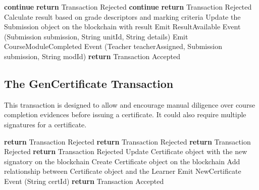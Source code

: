 \begin{algorithm}
	\begin{algorithmic}[0]
		\State \textbf{continue}
		\Else \textbf{ return} Transaction Rejected
		\EndIf
		\State \textbf{continue}
		\Else \textbf{ return} Transaction Rejected
		\EndIf
		\State Calculate result based on grade descriptors and marking criteria
		\State Update the Submission object on the blockchain with result
		\State Emit ResultAvailable Event (Submission submission, String unitId, String details)
		\State Emit CourseModuleCompleted Event (Teacher teacherAssigned, Submission submission, String modId)
		\EndIf
		\EndIf
		\State \textbf{return} Transaction Accepted
		\EndFunction
	\end{algorithmic}
\end{algorithm}

\subsection{The GenCertificate Transaction}

This transaction is designed to allow and encourage manual diligence over course completion evidences before issuing a certificate.
It could also require multiple signatures for a certificate.
\begin{algorithm}
	\begin{algorithmic}[0]
		 \textbf{return} Transaction Rejected \EndIf
		 \textbf{return} Transaction Rejected \EndIf
		\Else
		 \textbf{return} Transaction Rejected \EndIf
		 \textbf{return} Transaction Rejected \EndIf
		\EndIf
		\State Update Certificate object with the new signatory on the blockchain
		\Else
		\State Create Certificate object on the blockchain
		\EndIf
		\State Add relationship between Certificate object and the Learner
		\State Emit NewCertificate Event (String certId)
		\EndIf
		\State \textbf{return} Transaction Accepted
		\EndFunction
	\end{algorithmic}
\end{algorithm}

